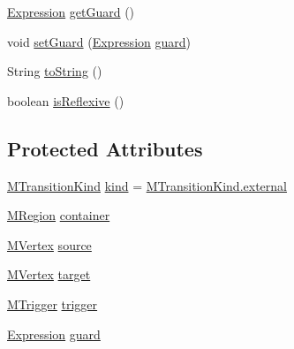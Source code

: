 \begin{DoxyCompactItemize}
\item 
\hyperlink{classorg_1_1tzi_1_1use_1_1uml_1_1ocl_1_1expr_1_1_expression}{Expression} \hyperlink{classorg_1_1tzi_1_1use_1_1uml_1_1mm_1_1statemachines_1_1_m_transition_acd6827dc25e45d5f3b78cbce0e6c7d13}{get\-Guard} ()
\item 
void \hyperlink{classorg_1_1tzi_1_1use_1_1uml_1_1mm_1_1statemachines_1_1_m_transition_a64c8388bcb0f34ec888afb4bc59ba7e2}{set\-Guard} (\hyperlink{classorg_1_1tzi_1_1use_1_1uml_1_1ocl_1_1expr_1_1_expression}{Expression} \hyperlink{classorg_1_1tzi_1_1use_1_1uml_1_1mm_1_1statemachines_1_1_m_transition_a31998277b9bccb7080bf411df6225ad7}{guard})
\item 
String \hyperlink{classorg_1_1tzi_1_1use_1_1uml_1_1mm_1_1statemachines_1_1_m_transition_a41acfadb1a45f6209341e1fa794ebab9}{to\-String} ()
\item 
boolean \hyperlink{classorg_1_1tzi_1_1use_1_1uml_1_1mm_1_1statemachines_1_1_m_transition_a11965dddfd7b1c1350460d5f4139ad79}{is\-Reflexive} ()
\end{DoxyCompactItemize}
\subsection*{Protected Attributes}
\begin{DoxyCompactItemize}
\item 
\hyperlink{enumorg_1_1tzi_1_1use_1_1uml_1_1mm_1_1statemachines_1_1_m_transition_kind}{M\-Transition\-Kind} \hyperlink{classorg_1_1tzi_1_1use_1_1uml_1_1mm_1_1statemachines_1_1_m_transition_a5ffe3f007d657d19eb79dc32f3cca30e}{kind} = \hyperlink{enumorg_1_1tzi_1_1use_1_1uml_1_1mm_1_1statemachines_1_1_m_transition_kind_a348c4b00357a306a424c86e642fb0e51}{M\-Transition\-Kind.\-external}
\item 
\hyperlink{classorg_1_1tzi_1_1use_1_1uml_1_1mm_1_1statemachines_1_1_m_region}{M\-Region} \hyperlink{classorg_1_1tzi_1_1use_1_1uml_1_1mm_1_1statemachines_1_1_m_transition_ace7d397d6075cffcdb50a7f8260b008e}{container}
\item 
\hyperlink{classorg_1_1tzi_1_1use_1_1uml_1_1mm_1_1statemachines_1_1_m_vertex}{M\-Vertex} \hyperlink{classorg_1_1tzi_1_1use_1_1uml_1_1mm_1_1statemachines_1_1_m_transition_a75e7dc92d45d783d8e0503e57c771133}{source}
\item 
\hyperlink{classorg_1_1tzi_1_1use_1_1uml_1_1mm_1_1statemachines_1_1_m_vertex}{M\-Vertex} \hyperlink{classorg_1_1tzi_1_1use_1_1uml_1_1mm_1_1statemachines_1_1_m_transition_aaaa81e7ce0744826e2b8e81a364a51b5}{target}
\item 
\hyperlink{classorg_1_1tzi_1_1use_1_1uml_1_1mm_1_1commonbehavior_1_1communications_1_1_m_trigger}{M\-Trigger} \hyperlink{classorg_1_1tzi_1_1use_1_1uml_1_1mm_1_1statemachines_1_1_m_transition_a2e4465cf1b947d667b48842d9879cc2d}{trigger}
\item 
\hyperlink{classorg_1_1tzi_1_1use_1_1uml_1_1ocl_1_1expr_1_1_expression}{Expression} \hyperlink{classorg_1_1tzi_1_1use_1_1uml_1_1mm_1_1statemachines_1_1_m_transition_a31998277b9bccb7080bf411df6225ad7}{guard}
\end{DoxyCompactItemize}


